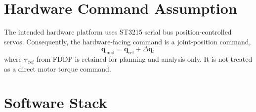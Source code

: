 \documentclass[12pt,a4paper]{report}
\begin{document}
\section{Hardware Command Assumption}
The intended hardware platform uses ST3215 serial bus position-controlled servos. Consequently, the hardware-facing command is a joint-position command,
\begin{equation}
    \mathbf{q}_{\mathrm{cmd}} = \mathbf{q}_{\mathrm{ref}} + \Delta\mathbf{q},
\end{equation}
where $\boldsymbol{\tau}_{\mathrm{ref}}$ from FDDP is retained for planning and analysis only. It is not treated as a direct motor torque command.
 
\section{Software Stack}
 
\end{document}
